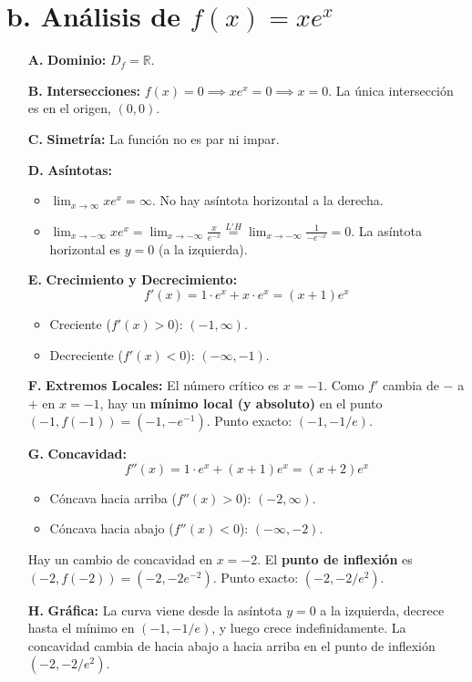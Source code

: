 \documentclass[12pt, letterpaper]{article}
\begin{document}
\section*{b. Análisis de $f(x) = xe^x$}
\begin{enumerate}
    \item[\textbf{A.}] \textbf{Dominio:} $D_f = \mathbb{R}$.

    \item[\textbf{B.}] \textbf{Intersecciones:} $f(x)=0 \implies xe^x = 0 \implies x=0$. La única intersección es en el origen, $(0,0)$.

    \item[\textbf{C.}] \textbf{Simetría:} La función no es par ni impar.

    \item[\textbf{D.}] \textbf{Asíntotas:}
    \begin{itemize}
        \item $\lim_{x\to\infty} xe^x = \infty$. No hay asíntota horizontal a la derecha.
        \item $\lim_{x\to-\infty} xe^x = \lim_{x\to-\infty} \frac{x}{e^{-x}} \overset{L'H}{=} \lim_{x\to-\infty} \frac{1}{-e^{-x}} = 0$. La asíntota horizontal es $y=0$ (a la izquierda).
    \end{itemize}

    \item[\textbf{E.}] \textbf{Crecimiento y Decrecimiento:}
    $$ f'(x) = 1 \cdot e^x + x \cdot e^x = (x+1)e^x $$
    \begin{itemize}
        \item Creciente ($f'(x)>0$): $(-1, \infty)$.
        \item Decreciente ($f'(x)<0$): $(-\infty, -1)$.
    \end{itemize}

    \item[\textbf{F.}] \textbf{Extremos Locales:} El número crítico es $x=-1$. Como $f'$ cambia de $-$ a $+$ en $x=-1$, hay un \textbf{mínimo local (y absoluto)} en el punto $(-1, f(-1)) = (-1, -e^{-1})$. Punto exacto: $(-1, -1/e)$.

    \item[\textbf{G.}] \textbf{Concavidad:}
    $$ f''(x) = 1 \cdot e^x + (x+1)e^x = (x+2)e^x $$
    \begin{itemize}
        \item Cóncava hacia arriba ($f''(x)>0$): $(-2, \infty)$.
        \item Cóncava hacia abajo ($f''(x)<0$): $(-\infty, -2)$.
    \end{itemize}
    Hay un cambio de concavidad en $x=-2$. El \textbf{punto de inflexión} es $(-2, f(-2)) = (-2, -2e^{-2})$. Punto exacto: $(-2, -2/e^2)$.

    \item[\textbf{H.}] \textbf{Gráfica:} La curva viene desde la asíntota $y=0$ a la izquierda, decrece hasta el mínimo en $(-1, -1/e)$, y luego crece indefinidamente. La concavidad cambia de hacia abajo a hacia arriba en el punto de inflexión $(-2, -2/e^2)$.
\end{enumerate}
\end{document}
